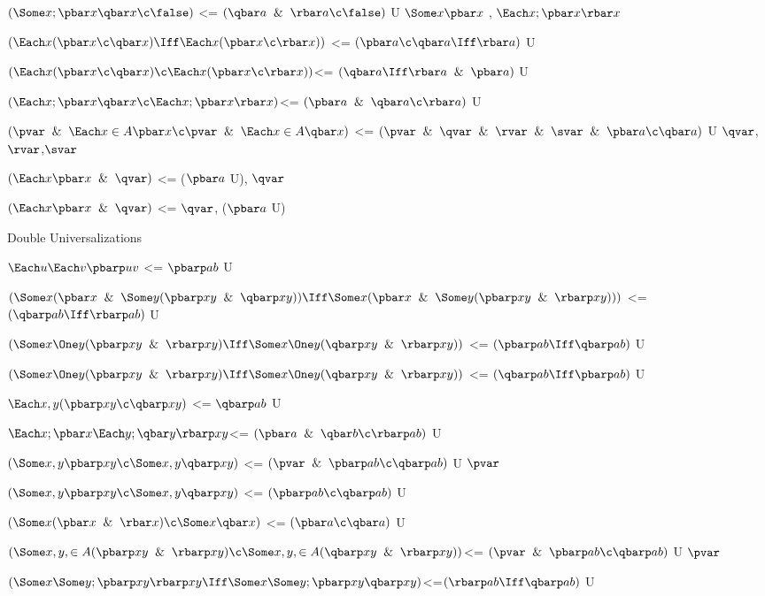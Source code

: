 $(\Some x ; \pbar x \qbar x \c \false)$ <= $(\qbar a \And \rbar a \c \false)$ U $\Some x \pbar x$ , $\Each x; \pbar x \rbar x$ 

$(\Each x(\pbar x \c \qbar x) \Iff \Each x (\pbar x \c \rbar x))$ <= $(\pbar a \c \qbar a \Iff \rbar a)$ U

$(\Each x (\pbar x \c \qbar x) \c \Each x (\pbar x \c \rbar x))$<= $(\qbar a \Iff \rbar a \And \pbar a)$ U

$(\Each x; \pbar x \qbar x \c\Each x;\pbar x \rbar x)$<= $(\pbar a \And \qbar a\c\rbar a)$ U

$(\pvar \And \Each x \in A\pbar x \c \pvar \And \Each x \in A \qbar x)$ <= $(\pvar \And \qvar \And \rvar \And \svar \And \pbar a \c \qbar a)$ U $\qvar$,$\rvar$,$\svar$

$(\Each x \pbar x \And \qvar)$ <= ($\pbar a$ U), $\qvar$

$(\Each x \pbar x \And \qvar)$ <= $\qvar$, ($\pbar a$ U)

\lineb

Double Universalizations
\lineb

$\Each u \Each v \pbarp uv $ <= $\pbarp ab $ U

$(\Some x(\pbar x \And \Some y (\pbarp xy \And \qbarp xy))\Iff\Some x(\pbar x \And \Some y (\pbarp xy \And \rbarp xy)))$ <= $(\qbarp ab \Iff \rbarp ab)$ U

$(\Some x\One y (\pbarp xy \And \rbarp xy)\Iff\Some x\One y(\qbarp xy \And \rbarp xy))$ <= $(\pbarp ab\Iff\qbarp ab)$ U

$(\Some x\One y (\pbarp xy \And \rbarp xy)\Iff\Some x\One y(\qbarp xy \And \rbarp xy))$ <= $(\qbarp ab\Iff\pbarp ab)$ U

$\Each x,y (\pbarp xy \c \qbarp xy)$ <= $\qbarp ab$ U

$\Each x ;\pbar x \Each y ;\qbar y \rbarp xy$<= $(\pbar a \And \qbar b \c \rbarp ab)$ U

$(\Some x,y \pbarp xy \c \Some x,y \qbarp xy)$ <= $(\pvar \And \pbarp ab \c \qbarp ab)$ U $\pvar$

$(\Some x,y \pbarp xy \c \Some x,y \qbarp xy)$ <= $(\pbarp ab \c \qbarp ab)$ U

$(\Some x (\pbar x \And \rbar x)\c\Some x \qbar x)$ <= $(\pbar a\c\qbar a)$ U

$(\Some x,y,\in A(\pbarp xy \And \rbarp xy)\c\Some x,y,\in A(\qbarp xy \And \rbarp xy))$<=    $(\pvar \And \pbarp ab \c \qbarp ab)$ U $\pvar$

$(\Some x \Some y ; \pbarp xy \rbarp xy \Iff \Some x \Some y ;\pbarp xy \qbarp xy)$<=$(\rbarp ab \Iff \qbarp ab)$ U

